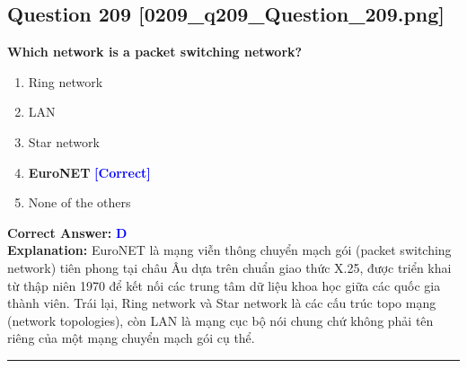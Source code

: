 \documentclass[11pt,a4paper]{article}
\begin{document}
\begin{minipage}{\textwidth}
\subsection*{Question 209 \quad \footnotesize{[0209\_q209\_Question\_209.png]}}
\noindent \textbf{Which network is a packet switching network?}

\begin{enumerate}[label=\Alph*.]
    \item Ring network
    \item LAN
    \item Star network
    \item \textbf{EuroNET} \hfill \textcolor{blue}{\textbf{[Correct]}}
    \item None of the others
\end{enumerate}

\noindent \textbf{Correct Answer:} \textcolor{blue}{\textbf{D}} \\[2pt]
\noindent \textbf{Explanation:} EuroNET là mạng viễn thông chuyển mạch gói (packet switching network) tiên phong tại châu Âu dựa trên chuẩn giao thức X.25, được triển khai từ thập niên 1970 để kết nối các trung tâm dữ liệu khoa học giữa các quốc gia thành viên. Trái lại, Ring network và Star network là các cấu trúc topo mạng (network topologies), còn LAN là mạng cục bộ nói chung chứ không phải tên riêng của một mạng chuyển mạch gói cụ thể.

\par\vspace{0.3cm}
\hrule
\vspace{0.3cm}
\end{minipage}
\end{document}
